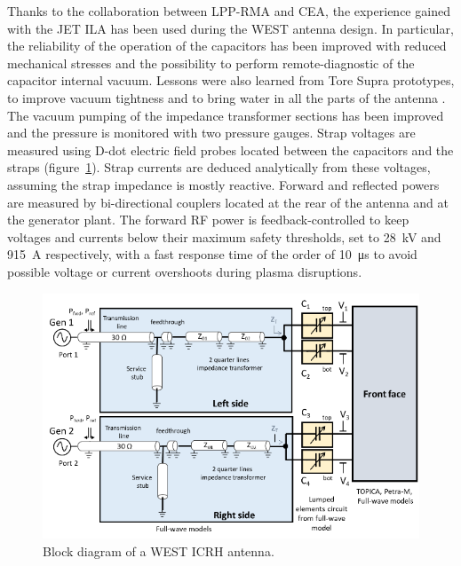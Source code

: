 \documentclass[12p]{iopart}
\begin{document}
Thanks to the collaboration between LPP-RMA and CEA, the experience gained with the JET ILA \cite{durodie2012-1} has been used during the WEST antenna design. In particular, the reliability of the operation of the capacitors has been improved with reduced mechanical stresses and the possibility to perform remote-diagnostic of the capacitor internal vacuum. Lessons were also learned from Tore Supra prototypes, to improve vacuum tightness and to bring water in all the parts of the antenna \cite{vulliez2008, vulliez2015}. The vacuum pumping of the impedance transformer sections has been improved and the pressure is monitored with two pressure gauges. Strap voltages are measured using D-dot electric field probes located between the capacitors and the straps (figure~\ref{fig:westicrhblockdiagram}). Strap currents are deduced analytically from these voltages, assuming the strap impedance is mostly reactive. Forward and reflected powers are measured by bi-directional couplers located at the rear of the antenna and at the generator plant. The forward RF power is feedback-controlled to keep voltages and currents below their maximum safety thresholds, set to \SI{28}{\kilo\volt} and \SI{915}{\ampere} respectively, with a fast response time of the order of \SI{10}{\micro\second} to avoid possible voltage or current overshoots during plasma disruptions.

\begin{figure}
	\centering
	\includegraphics[width=0.95\linewidth]{figures/WEST_ICRH_block_diagram}
	\caption{Block diagram of a WEST ICRH antenna.}
	\label{fig:westicrhblockdiagram}
\end{figure}
\end{document}
